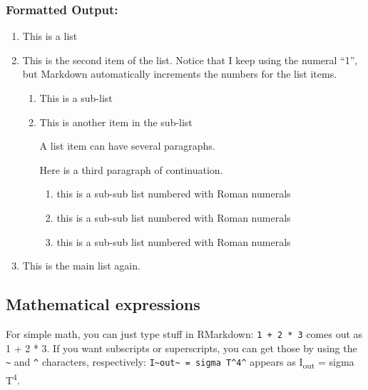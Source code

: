 \documentclass[
]{article}
\begin{document}
\hypertarget{formatted-output-4}{%
\subsubsection{Formatted Output:}\label{formatted-output-4}}

\begin{enumerate}
\def\labelenumi{\arabic{enumi}.}
\item
  This is a list
\item
  This is the second item of the list. Notice that I keep using the
  numeral ``1'', but Markdown automatically increments the numbers for
  the list items.

  \begin{enumerate}
  \def\labelenumii{\alph{enumii})}
  \item
    This is a sub-list
  \item
    This is another item in the sub-list

    A list item can have several paragraphs.

    Here is a third paragraph of continuation.

    \begin{enumerate}
    \def\labelenumiii{\roman{enumiii})}
    \item
      this is a sub-sub list numbered with Roman numerals
    \item
      this is a sub-sub list numbered with Roman numerals
    \item
      this is a sub-sub list numbered with Roman numerals
    \end{enumerate}
  \end{enumerate}
\item
  This is the main list again.
\end{enumerate}

\hypertarget{mathematical-expressions}{%
\subsection{Mathematical expressions}\label{mathematical-expressions}}

For simple math, you can just type stuff in RMarkdown:
\texttt{1\ +\ 2\ *\ 3} comes out as 1 + 2 * 3. If you want subscripts or
superscripts, you can get those by using the \texttt{\textasciitilde{}}
and \texttt{\^{}} characters, respectively:
\texttt{I\textasciitilde{}out\textasciitilde{}\ =\ sigma\ T\^{}4\^{}}
appears as I\textsubscript{out} = sigma T\textsuperscript{4}.
\end{document}
